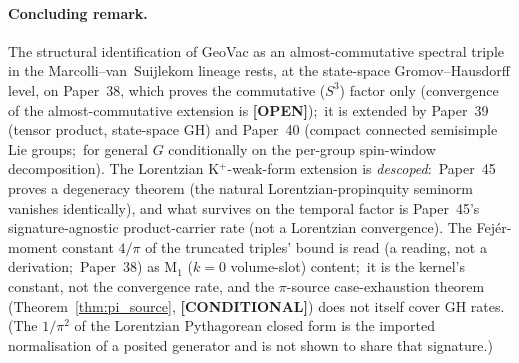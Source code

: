 \documentclass[11pt,a4paper]{article}
\theoremstyle{plain}
\theoremstyle{definition}
\newcommand{\gvc}[2]{#2}
\begin{document}
\paragraph{Concluding remark.}
The structural identification of GeoVac as an almost-commutative
spectral triple in the Marcolli--van~Suijlekom lineage rests, at the
state-space Gromov--Hausdorff level, \gvc{wh1-p38-gh-convergence}{on Paper~38, which proves the
commutative ($S^3$) factor only (convergence of the almost-commutative
extension is \textbf{[OPEN]})};\ it is extended by Paper~39 (tensor product,
state-space GH) and \gvc{p40-general-g-conditional}{Paper~40 (compact connected semisimple Lie groups;\
for general $G$ conditionally on the per-group spin-window
decomposition)}.  The Lorentzian
K$^{+}$-weak-form extension is \emph{descoped}:\ \gvc{p45-rates-spatial}{Paper~45 proves a
degeneracy theorem (the natural Lorentzian-propinquity seminorm
vanishes identically), and what survives on the temporal factor is
Paper~45's signature-agnostic product-carrier rate (not a Lorentzian
convergence)}.  \gvc{m1-gh-rate-reading}{The Fej\'er-moment constant $4/\pi$ of the truncated triples' bound is read (a reading, not a derivation;\ Paper~38) as M$_{1}$
($k = 0$ volume-slot) content;\ it is the kernel's constant, not the
convergence rate, and the $\pi$-source case-exhaustion
theorem (Theorem~\ref{thm:pi_source}, \textbf{[CONDITIONAL]}) does not
itself cover GH rates}.  (The $1/\pi^{2}$ of the
Lorentzian Pythagorean closed form is the imported normalisation of a
posited generator and is not shown to share that signature.)

\end{document}
